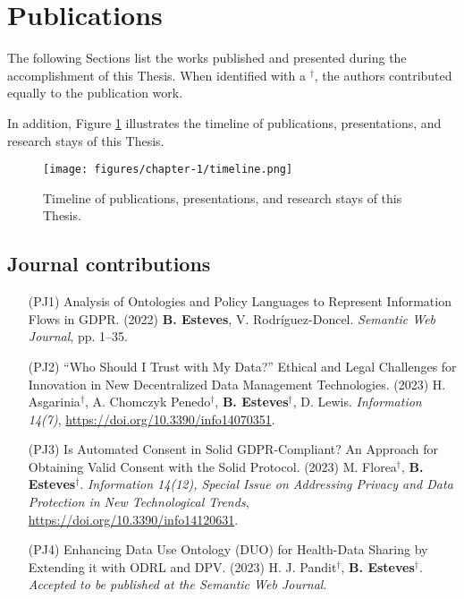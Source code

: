 \section{Publications}
\label{sec:publications}

The following Sections list the works published and presented during the accomplishment of this Thesis. When identified with a $^{\dagger}$, the authors contributed equally to the publication work.

In addition, Figure \ref{fig:timeline} illustrates the timeline of publications, presentations, and research stays of this Thesis.

\begin{figure}
    \centering
    \texttt{[image: figures/chapter-1/timeline.png]}
    \caption{Timeline of publications, presentations, and research stays of this Thesis.}
    \label{fig:timeline}
\end{figure}

\subsection{Journal contributions}
\label{sec:publications_journal}

\begin{enumerate}
    \item [(PJ1)] Analysis of Ontologies and Policy Languages to Represent Information Flows in GDPR. (2022) \textbf{B. Esteves}, V. Rodríguez-Doncel. \textit{Semantic Web Journal}, pp. 1--35. %
    \item [(PJ2)] ``Who Should I Trust with My Data?'' Ethical and Legal Challenges for Innovation in New Decentralized Data Management Technologies. (2023) H. Asgarinia$^{\dagger}$, A. Chomczyk Penedo$^{\dagger}$, \textbf{B. Esteves}$^{\dagger}$, D. Lewis. \textit{Information 14(7)}, \url{https://doi.org/10.3390/info14070351}.
    \item [(PJ3)] Is Automated Consent in Solid GDPR-Compliant? An Approach for Obtaining Valid Consent with the Solid Protocol. (2023) M. Florea$^{\dagger}$, \textbf{B. Esteves}$^{\dagger}$. \textit{Information 14(12), Special Issue on Addressing Privacy and Data Protection in New Technological Trends}, \url{https://doi.org/10.3390/info14120631}.
    \item [(PJ4)] Enhancing Data Use Ontology (DUO) for Health-Data Sharing by Extending it with ODRL and DPV. (2023) H. J. Pandit$^{\dagger}$, \textbf{B. Esteves}$^{\dagger}$.  \textit{Accepted to be published at the Semantic Web Journal}. %
\end{enumerate}

